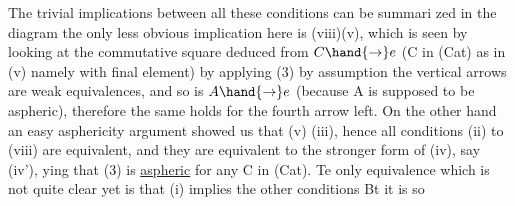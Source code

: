 The trivial implications between all these conditions can be summari
zed in the diagram
the only  less obvious implication here is (viii)\hand{$\Rightarrow$}(v), which is seen
by looking at the commutative square deduced from $C \hand{\to} e$ (C in (Cat) as in
(v)\xout{\unsure{;}} namely with final element) by applying (3)
by assumption the vertical arrows are weak equivalences, and so is $A \hand{\to} e$
(because A is supposed to be aspheric), therefore the same holds for the
fourth arrow left. On the other hand an easy asphericity argument
showed us \inserted{[\unsure{\S}.30]} that (v) \hand{$\Longrightarrow$}(iii), hence all conditions (ii) to (viii) are
equivalent, and they are equivalent to the stronger form of (iv), 
say (iv'), ying that (3) is \uline{aspheric} for any C in (Cat). Te only
equivalence which is not quite clear yet is that (i) implies the other
conditions  Bt it is so
